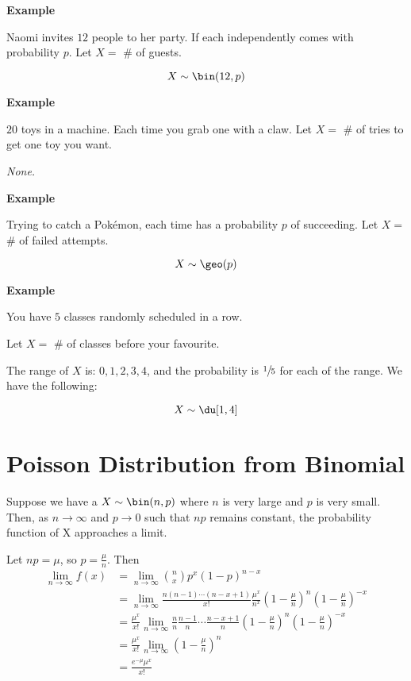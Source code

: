 \textbf{Example}

Naomi invites $ 12 $ people to her party. If each independently comes with
probability $ p $.
Let $ X= $ \# of guests.

\[ X \sim \bin(12,p) \]

\textbf{Example}

$ 20 $ toys in a machine. Each time you grab one with a claw.
Let $ X= $ \# of tries to get one toy you want.

\emph{None.}

\textbf{Example}

Trying to catch a Pokémon, each time has a probability $ p $ of succeeding.
Let $ X= $ \# of failed attempts.

\[ X \sim \geo(p) \]

\textbf{Example}

You have $ 5 $ classes randomly scheduled in a row.

Let $ X= $ \# of classes before your favourite.

The range of $ X $ is: $ 0,1,2,3,4 $, and the probability is
$ \sfrac{1}{5} $ for each of the range. We have the following:

\[ X \sim \du[1,4] \]

\section{Poisson Distribution from Binomial}

Suppose we have a $ X \sim \bin(n,p) $ where $ n $ is very large
and $ p $ is very small. Then, as $ n\rightarrow \infty $ and $ p\rightarrow 0 $
such that $ np $ remains constant, the probability function of X
approaches a limit.

Let $ np=\mu $, so $ p=\frac{\mu}{n} $. Then
\begin{align*}
    \lim\limits_{{n} \to {\infty}} f\left(x\right)
     & =\lim\limits_{{n} \to {\infty}} \binom{n}{x}p^x\left(1-p\right)^{n-x}                            \\
     & =\lim\limits_{{n} \to {\infty}} \frac{n\left(n-1\right)\cdots\left(n-x+1\right)}{x!}
    \frac{\mu^x}{n^x} \left(1-\frac{\mu}{n}\right)^n\left(1-\frac{\mu}{n}\right)^{-x}                   \\
     & =\frac{\mu^x}{x!} \lim\limits_{{n} \to {\infty}} \frac{n}{n}
    \frac{n-1}{n} \cdots \frac{n-x+1}{n}\left(1-\frac{\mu}{n}\right)^n\left(1-\frac{\mu}{n}\right)^{-x} \\
     & =\frac{\mu^x}{x!} \lim\limits_{{n} \to {\infty}} \left(1-\frac{\mu}{n}\right)^n                  \\
     & =\frac{e^{-\mu}\mu^x}{x!}                                                                        \\
\end{align*}

